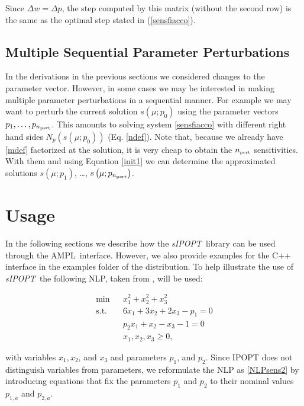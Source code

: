 \documentclass[letter, 11pt]{article}
\newcommand{\sensKKT}{\emph{sIPOPT}}
\newcommand{\AMPL}{AMPL}
\newcommand{\parens}[1]{\ensuremath{\left( #1 \right)}}
\newcommand{\func}[2]{\ensuremath{ #1\parens{#2}  }}
\begin{document}
Since $\Delta w = \Delta p$, the step computed by this matrix (without
the second row) is the same as the optimal step stated in
(\ref{sensfiacco}).


\subsection{Multiple Sequential Parameter Perturbations} \label{sec:multirhs}


In the derivations in the previous sections we considered changes to the parameter vector.
However, in some cases we may be interested in making multiple parameter perturbations in a sequential manner.
For example we may want to perturb the current solution {\func{s}{\mu; p_0}} using the parameter vectors
$p_1, \ldots, p_{n_{\mbox{\tiny pert}}}$. This amounts to solving system \eqref{sensfiacco} with different right hand sides
{\func{N_p}{\func{s}{\mu;p_0}}} (Eq. \eqref{ndef}). Note that, because we already have \eqref{mdef}
factorized at the solution, it is very
cheap to obtain the $n_{\mbox{\tiny pert}}$ sensitivities. With them and using Equation \eqref{init1}
we can determine the approximated solutions {\func{s}{\mu; p_1}}, \ldots, {\func{s}{\mu; p_{n_{\mbox{\tiny pert}}}}}.


\section{Usage}

In the following sections we describe how the \sensKKT\ library can be used through the \AMPL\ interface.
However, we also provide examples for the C++ interface in the examples folder of the distribution.
To help illustrate the use of \sensKKT\ the following NLP, taken from \cite{Ganesh1987}, will be used:

\begin{eqnarray}  \label{eq:ex1}
    \min&& x_1^2+x_2^2+x_3^2\\
  \mathrm{s.t.}&&6x_1+3x_2+2x_3-p_1 = 0\nonumber\\
  &&p_2x_1+x_2-x_3-1 = 0\nonumber\\
  &&x_1,x_2,x_3\geq 0 , \nonumber
\end{eqnarray}

\noindent with variables $x_1,x_2$, and $x_3$ and parameters $p_1$, and $p_2$.
Since IPOPT does not distinguish variables from parameters, we reformulate
the NLP as \eqref{NLPsens2} by introducing equations
that fix the parameters $p_1$ and $p_2$ to their nominal values
$p_{1,a}$ and $p_{2,a}$.
\end{document}
